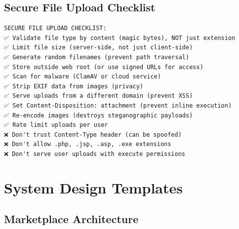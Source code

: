 \documentclass[10pt, a4paper]{article}
\begin{document}
\subsection{Secure File Upload Checklist}


\begin{lstlisting}
SECURE FILE UPLOAD CHECKLIST:
✅ Validate file type by content (magic bytes), NOT just extension
✅ Limit file size (server-side, not just client-side)
✅ Generate random filenames (prevent path traversal)
✅ Store outside web root (or use signed URLs for access)
✅ Scan for malware (ClamAV or cloud service)
✅ Strip EXIF data from images (privacy)
✅ Serve uploads from a different domain (prevent XSS)
✅ Set Content-Disposition: attachment (prevent inline execution)
✅ Re-encode images (destroys steganographic payloads)
✅ Rate limit uploads per user
❌ Don't trust Content-Type header (can be spoofed)
❌ Don't allow .php, .jsp, .asp, .exe extensions
❌ Don't serve user uploads with execute permissions
\end{lstlisting}


\bigskip


\section{System Design Templates}


\subsection{Marketplace Architecture}
\end{document}
